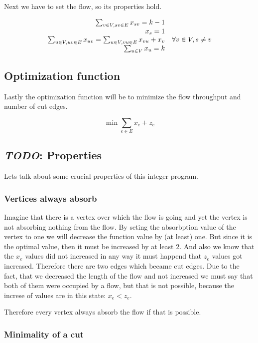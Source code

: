 \documentclass{article}
\begin{document}
	Next we have to set the flow, so its properties hold.
	
	$$
	\begin{array}{r l}
		\sum_{v \in V, sv \in E} x_{sv} = k-1 \\
		x_s = 1 \\
		\sum_{u \in V, uv \in E} x_{uv} = \sum_{u \in V, vu \in E} x_{vu} + x_v & \forall v \in V, s \neq v \\
		\sum_{u \in V} x_u = k
	\end{array}
	$$
	
	\subsection{Optimization function}
	
	Lastly the optimization function will be to minimize the flow throughput and number of cut edges.
	
	$$
	\min \sum_{e \in E} x_e + z_e
	$$
	
	\subsection{\textit{TODO}: Properties}
	
	Lets talk about some crucial properties of this integer program.
		
	
	\subsubsection{Vertices always absorb}
		
	Imagine that there is a vertex over which the flow is going and yet the vertex is not absorbing nothing from the flow. By seting the absorbption value of the vertex to one we will decrease the function value by (at least) one. But since it is the optimal value, then it must be increased by at least 2. And also we know that the $x_e$ values did not increased in any way it must happend that $z_e$ values got increased. Therefore there are two edges which became cut edges. Due to the fact, that we decreased the length of the flow and not increased we must say that both of them were occupied by a flow, but that is not possible, because the increse of values are in this state: $x_e < z_e$.
	
	Therefore every vertex always absorb the flow if that is possible.
	
	\subsubsection{Minimality of a cut}
	
\end{document}
